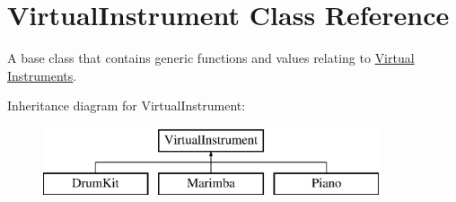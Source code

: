 \hypertarget{class_virtual_instrument}{}\section{Virtual\+Instrument Class Reference}
\label{class_virtual_instrument}


A base class that contains generic functions and values relating to \hyperlink{group___v_i}{Virtual Instruments}.  


Inheritance diagram for Virtual\+Instrument\+:\begin{figure}[H]
\begin{center}
\leavevmode
\includegraphics[height=2.000000cm]{class_virtual_instrument}
\end{center}
\end{figure}
